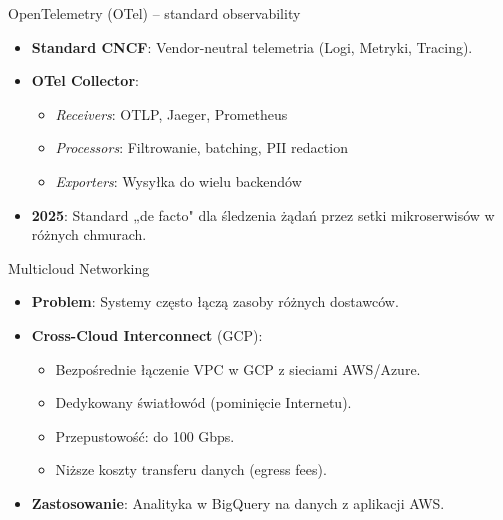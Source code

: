 \documentclass[aspectratio=169]{beamer}
\begin{document}
\begin{frame}{OpenTelemetry (OTel) – standard observability}
    \begin{itemize}
        \item \textbf{Standard CNCF}: Vendor-neutral telemetria (Logi, Metryki, Tracing).
        \item \textbf{OTel Collector}:
        \begin{itemize}
            \item \textit{Receivers}: OTLP, Jaeger, Prometheus
            \item \textit{Processors}: Filtrowanie, batching, PII redaction
            \item \textit{Exporters}: Wysyłka do wielu backendów
        \end{itemize}
        \item \textbf{2025}: Standard „de facto" dla śledzenia żądań przez setki mikroserwisów w różnych chmurach.
    \end{itemize}
\end{frame}

\begin{frame}{Multicloud Networking}
    \begin{itemize}
        \item \textbf{Problem}: Systemy często łączą zasoby różnych dostawców.
        \item \textbf{Cross-Cloud Interconnect} (GCP):
        \begin{itemize}
            \item Bezpośrednie łączenie VPC w GCP z sieciami AWS/Azure.
            \item Dedykowany światłowód (pominięcie Internetu).
            \item Przepustowość: do 100 Gbps.
            \item Niższe koszty transferu danych (egress fees).
        \end{itemize}
        \item \textbf{Zastosowanie}: Analityka w BigQuery na danych z aplikacji AWS.
    \end{itemize}
\end{frame}
\end{document}
